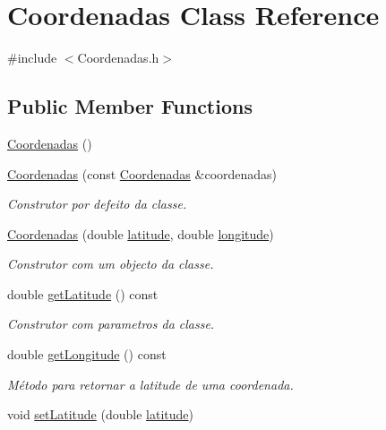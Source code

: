 \hypertarget{class_coordenadas}{\section{Coordenadas Class Reference}
\label{class_coordenadas}
}


{\ttfamily \#include $<$Coordenadas.\+h$>$}

\subsection*{Public Member Functions}
\begin{DoxyCompactItemize}
\item 
\hyperlink{class_coordenadas_a1c58a9c0153e6955da84b0861a925c68}{Coordenadas} ()
\item 
\hyperlink{class_coordenadas_a020d5ed69cf70031b77ec5bc3bcb62cb}{Coordenadas} (const \hyperlink{class_coordenadas}{Coordenadas} \&coordenadas)
\begin{DoxyCompactList}\small\item\em Construtor por defeito da classe. \end{DoxyCompactList}\item 
\hyperlink{class_coordenadas_a48d1210d6636eadb64690a2a75686658}{Coordenadas} (double \hyperlink{class_coordenadas_ad7aa0271fc0ca8c8da179f9cfe859bf0}{latitude}, double \hyperlink{class_coordenadas_a328c0d572b3a7d47bfbd866f5d6d6489}{longitude})
\begin{DoxyCompactList}\small\item\em Construtor com um objecto da classe. \end{DoxyCompactList}\item 
double \hyperlink{class_coordenadas_a1eac916230125776b081b09bf5121c8e}{get\+Latitude} () const 
\begin{DoxyCompactList}\small\item\em Construtor com parametros da classe. \end{DoxyCompactList}\item 
double \hyperlink{class_coordenadas_ae2f616716136f0651d389e4824092c55}{get\+Longitude} () const 
\begin{DoxyCompactList}\small\item\em Método para retornar a latitude de uma coordenada. \end{DoxyCompactList}\item 
void \hyperlink{class_coordenadas_a035cce119d74a61cb24676ef76f0f518}{set\+Latitude} (double \hyperlink{class_coordenadas_ad7aa0271fc0ca8c8da179f9cfe859bf0}{latitude})

\end{DoxyCompactItemize}
